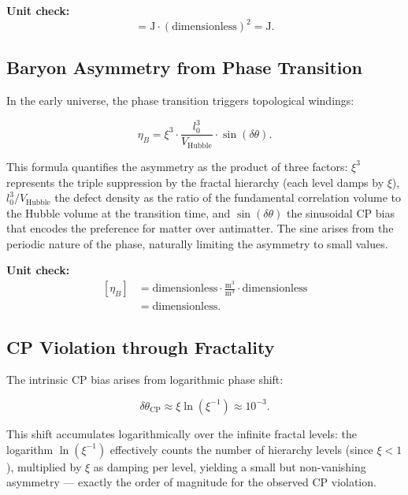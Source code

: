 	\textbf{Unit check:}
	\begin{equation}
		[E_n] = \si{\joule} \cdot (\text{dimensionless})^2 = \si{\joule}.
	\end{equation}
	
	\subsection*{Baryon Asymmetry from Phase Transition}
	
	In the early universe, the phase transition triggers topological windings:
	
	\begin{equation}
		\eta_B = \xi^3 \cdot \frac{l_0^3}{V_{\text{Hubble}}} \cdot \sin(\delta \theta).
	\end{equation}
	
	This formula quantifies the asymmetry as the product of three factors: \(\xi^3\) represents the triple suppression by the fractal hierarchy (each level damps by \(\xi\)), \(l_0^3 / V_{\text{Hubble}}\) the defect density as the ratio of the fundamental correlation volume to the Hubble volume at the transition time, and \(\sin(\delta \theta)\) the sinusoidal CP bias that encodes the preference for matter over antimatter. The sine arises from the periodic nature of the phase, naturally limiting the asymmetry to small values.
	
	\textbf{Unit check:}
     \begin{equation}
	\begin{aligned}
		[\eta_B]
		&= \text{dimensionless}
		\cdot \frac{\si{\meter\cubed}}{\si{\meter\cubed}}
		\cdot \text{dimensionless} \\
		&= \text{dimensionless}.
	\end{aligned}
\end{equation}
	
	\subsection*{CP Violation through Fractality}
	
	The intrinsic CP bias arises from logarithmic phase shift:
	
	\begin{equation}
		\delta \theta_{\text{CP}} \approx \xi \ln(\xi^{-1}) \approx 10^{-3}.
	\end{equation}
	
	This shift accumulates logarithmically over the infinite fractal levels: the logarithm \(\ln(\xi^{-1})\) effectively counts the number of hierarchy levels (since \(\xi < 1\)), multiplied by \(\xi\) as damping per level, yielding a small but non-vanishing asymmetry — exactly the order of magnitude for the observed CP violation.
	

